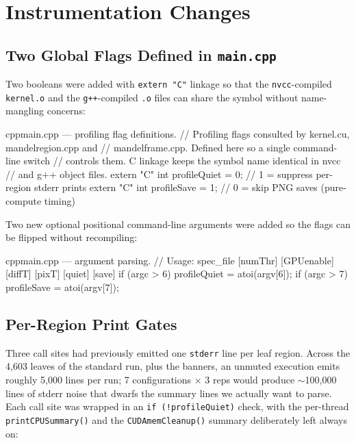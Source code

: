\documentclass[
	english,
	letterpaper, oneside
]{article}
\begin{document}
\section{Instrumentation Changes}

\subsection{Two Global Flags Defined in \texttt{main.cpp}}

Two booleans were added with \texttt{extern "C"} linkage so that the
\texttt{nvcc}-compiled \texttt{kernel.o} and the \texttt{g++}-compiled
\texttt{.o} files can share the symbol without name-mangling concerns:

\begin{sourcecode}{cpp}{main.cpp --- profiling flag definitions.}
// Profiling flags consulted by kernel.cu, mandelregion.cpp and
// mandelframe.cpp.  Defined here so a single command-line switch
// controls them.  C linkage keeps the symbol name identical in nvcc
// and g++ object files.
extern "C" int profileQuiet = 0;   // 1 = suppress per-region stderr prints
extern "C" int profileSave  = 1;   // 0 = skip PNG saves (pure-compute timing)
\end{sourcecode}

Two new optional positional command-line arguments were added so the
flags can be flipped without recompiling:

\begin{sourcecode}{cpp}{main.cpp --- argument parsing.}
// Usage: spec_file [numThr] [GPUenable] [diffT] [pixT] [quiet] [save]
if (argc > 6) profileQuiet = atoi(argv[6]);
if (argc > 7) profileSave  = atoi(argv[7]);
\end{sourcecode}

\subsection{Per-Region Print Gates}

Three call sites had previously emitted one \texttt{stderr} line per
leaf region. Across the 4{,}603 leaves of the standard run, plus the
banners, an unmuted execution emits roughly 5{,}000 lines per run; 7
configurations $\times$ 3 reps would produce $\sim$100{,}000 lines of
stderr noise that dwarfs the summary lines we actually want to parse.
Each call site was wrapped in an \texttt{if (!profileQuiet)} check, with
the per-thread \texttt{printCPUSummary()} and the
\texttt{CUDAmemCleanup()} summary deliberately left always on:
\end{document}
